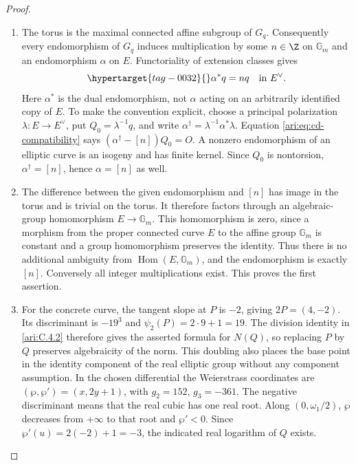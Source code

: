 \begin{proof}
\begin{enumerate}[label=\arabic*.,leftmargin=*]
\item The torus is the maximal connected affine subgroup of $G_q$.
Consequently every endomorphism of $G_q$ induces multiplication
by some $n\in\Z$ on $\mathbb G_m$ and an endomorphism
$\alpha$ on $E$. Functoriality of extension classes gives
\begin{equation}\hypertarget{tag-0032}{}\label{ari:eq:cd-compatibility}
 \alpha^*q=nq\quad\text{in }E^\vee.
\end{equation}
Here $\alpha^*$ is the dual endomorphism, not $\alpha$
acting on an arbitrarily identified copy of $E$. To make the
convention explicit, choose a principal polarization
$\lambda:E\to E^\vee$, put $Q_0=\lambda^{-1}q$, and
write $\alpha^\dagger=\lambda^{-1}\alpha^*\lambda$.
Equation \eqref{ari:eq:cd-compatibility} says
$(\alpha^\dagger-[n])Q_0=O$. A nonzero endomorphism of an
elliptic curve is an isogeny and has finite kernel. Since
$Q_0$ is nontorsion, $\alpha^\dagger=[n]$, hence
$\alpha=[n]$ as well.

\item The difference between the given endomorphism and $[n]$ has
image in the torus and is trivial on the torus. It therefore
factors through an algebraic-group homomorphism
$E\to\mathbb G_m$. This homomorphism is zero, since a
morphism from the proper connected curve $E$ to the affine
group $\mathbb G_m$ is constant and a group homomorphism
preserves the identity. Thus there is no additional ambiguity
from $\operatorname{Hom}(E,\mathbb G_m)$, and the
endomorphism is exactly $[n]$. Conversely all integer
multiplications exist. This proves the first assertion.

\item For the concrete curve, the tangent slope at $P$ is $-2$,
giving $2P=(4,-2)$. Its discriminant is $-19^3$ and
$\psi_2(P)=2\cdot9+1=19$. The division identity in \cref{ari:C.4.2}
therefore gives the asserted formula for $N(Q)$, so replacing
$P$ by $Q$ preserves algebraicity of the norm. This doubling
also places the base point in the identity component of the
real elliptic group without any component assumption. In the
chosen differential the Weierstrass coordinates are
$(\wp,\wp')=(x,2y+1)$, with $g_2=152$, $g_3=-361$.
The negative discriminant means that the real cubic has one
real root. Along $(0,\omega_1/2)$, $\wp$ decreases from
$+\infty$ to that root and $\wp'<0$. Since
$\wp'(u)=2(-2)+1=-3$, the indicated real logarithm of $Q$
exists.


\end{enumerate}
\end{proof}
